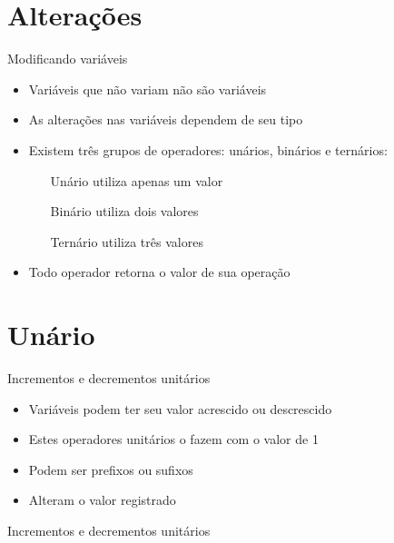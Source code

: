 \documentclass[11pt]{beamer}
\subtitle{Qual o resultado?}
\begin{document}
\begin{frame}
	\titlepage
\end{frame}

\begin{frame}
	\tableofcontents
\end{frame}

\section{Alterações}
	\begin{frame}{Modificando variáveis}
		\begin{itemize}
			\presentationPause\item Variáveis que não variam não são variáveis
			\presentationPause\item As alterações nas variáveis dependem de seu tipo
			\presentationPause\item Existem três grupos de operadores: unários, binários e ternários:
			\begin{itemize}
				\presentationPause\item[Unário] utiliza apenas um valor
				\presentationPause\item[Binário] utiliza dois valores
				\presentationPause\item[Ternário] utiliza três valores
			\end{itemize}
			\presentationPause\item Todo operador retorna o valor de sua operação
		\end{itemize}
	\end{frame}

\section{Unário}
	\begin{frame}{Incrementos e decrementos unitários}
		\begin{itemize}
			\presentationPause\item Variáveis podem ter seu valor acrescido ou descrescido
			\presentationPause\item Estes operadores unitários o fazem com o valor de 1
			\presentationPause\item Podem ser prefixos ou sufixos
			\presentationPause\item Alteram o valor registrado
		\end{itemize}
		\presentationPause
	\end{frame}\begin{frame}{Incrementos e decrementos unitários}
		
	\end{frame}
\end{document}
